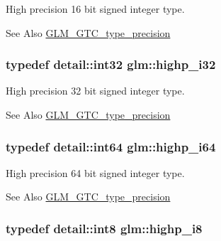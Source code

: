 High precision 16 bit signed integer type. \begin{DoxySeeAlso}{See Also}
\hyperlink{group__gtc__type__precision}{G\-L\-M\-\_\-\-G\-T\-C\-\_\-type\-\_\-precision} 
\end{DoxySeeAlso}
\hypertarget{group__gtc__type__precision_ga197d19b585222da57d70238a5cfc2be8}{
\subsubsection[{highp\-\_\-i32}]{\setlength{\rightskip}{0pt plus 5cm}typedef detail\-::int32 {\bf glm\-::highp\-\_\-i32}}}\label{group__gtc__type__precision_ga197d19b585222da57d70238a5cfc2be8}
High precision 32 bit signed integer type. \begin{DoxySeeAlso}{See Also}
\hyperlink{group__gtc__type__precision}{G\-L\-M\-\_\-\-G\-T\-C\-\_\-type\-\_\-precision} 
\end{DoxySeeAlso}
\hypertarget{group__gtc__type__precision_gad3cb9a0ac0266ea2c51c6fac256345d1}{
\subsubsection[{highp\-\_\-i64}]{\setlength{\rightskip}{0pt plus 5cm}typedef detail\-::int64 {\bf glm\-::highp\-\_\-i64}}}\label{group__gtc__type__precision_gad3cb9a0ac0266ea2c51c6fac256345d1}
High precision 64 bit signed integer type. \begin{DoxySeeAlso}{See Also}
\hyperlink{group__gtc__type__precision}{G\-L\-M\-\_\-\-G\-T\-C\-\_\-type\-\_\-precision} 
\end{DoxySeeAlso}
\hypertarget{group__gtc__type__precision_ga8b9eb0b24cce7f14478bfcacb53ce839}{
\subsubsection[{highp\-\_\-i8}]{\setlength{\rightskip}{0pt plus 5cm}typedef detail\-::int8 {\bf glm\-::highp\-\_\-i8}}}\label{group__gtc__type__precision_ga8b9eb0b24cce7f14478bfcacb53ce839}
